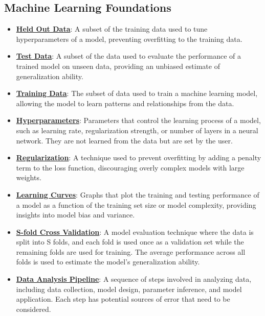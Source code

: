 \documentclass{article}%
\begin{document}
\subsection{Machine Learning Foundations}%
\label{subsec:MachineLearningFoundations}%
\begin{itemize}[leftmargin=*]%
\item \href{https://www.math.purdue.edu/~yipn/351/10L1-CrossValidation.pdf#page=6}{\textbf{Held Out Data}}: A subset of the training data used to tune hyperparameters of a model, preventing overfitting to the training data.%
\item \href{https://www.math.purdue.edu/~yipn/351/10L1-CrossValidation.pdf#page=6}{\textbf{Test Data}}: A subset of the data used to evaluate the performance of a trained model on unseen data, providing an unbiased estimate of generalization ability.%
\item \href{https://www.math.purdue.edu/~yipn/351/10L1-CrossValidation.pdf#page=6}{\textbf{Training Data}}: The subset of data used to train a machine learning model, allowing the model to learn patterns and relationships from the data.%
\item \href{https://www.math.purdue.edu/~yipn/351/10L1-CrossValidation.pdf#page=14}{\textbf{Hyperparameters}}: Parameters that control the learning process of a model, such as learning rate, regularization strength, or number of layers in a neural network. They are not learned from the data but are set by the user.%
\item \href{https://www.math.purdue.edu/~yipn/351/10L1-CrossValidation.pdf#page=17}{\textbf{Regularization}}: A technique used to prevent overfitting by adding a penalty term to the loss function, discouraging overly complex models with large weights.%
\item \href{https://www.math.purdue.edu/~yipn/351/10L1-CrossValidation.pdf#page=20}{\textbf{Learning Curves}}: Graphs that plot the training and testing performance of a model as a function of the training set size or model complexity, providing insights into model bias and variance.%
\item \href{https://www.math.purdue.edu/~yipn/351/10L1-CrossValidation.pdf#page=25}{\textbf{S-fold Cross Validation}}: A model evaluation technique where the data is split into S folds, and each fold is used once as a validation set while the remaining folds are used for training. The average performance across all folds is used to estimate the model's generalization ability.%
\item \href{https://www.math.purdue.edu/~yipn/351/10L1-CrossValidation.pdf#page=26}{\textbf{Data Analysis Pipeline}}: A sequence of steps involved in analyzing data, including data collection, model design, parameter inference, and model application. Each step has potential sources of error that need to be considered.%

\end{itemize}
\end{document}
